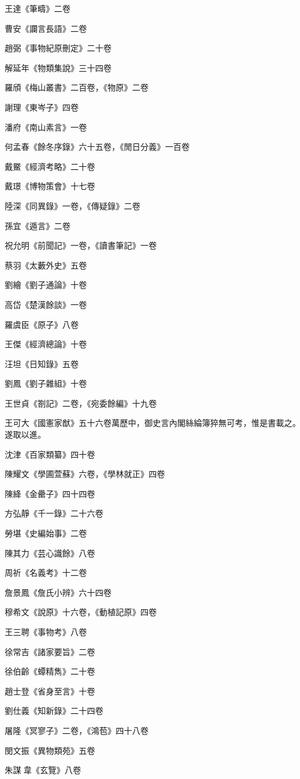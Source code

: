 王達《筆疇》二卷

曹安《讕言長語》二卷

趙弼《事物紀原刪定》二十卷

解延年《物類集說》三十四卷

羅頎《梅山叢書》二百卷，《物原》二卷

謝理《東岑子》四卷

潘府《南山素言》一卷

何孟春《餘冬序錄》六十五卷，《閒日分義》一百卷

戴鱀《經濟考略》二十卷

戴璟《博物策會》十七卷

陸深《同異錄》一卷，《傳疑錄》二卷

孫宜《遁言》二卷

祝允明《前聞記》一卷，《讀書筆記》一卷

蔡羽《太藪外史》五卷

劉繪《劉子通論》十卷

高岱《楚漢餘談》一卷

羅虞臣《原子》八卷

王傑《經濟總論》十卷

汪坦《日知錄》五卷

劉鳳《劉子雜組》十卷

王世貞《劄記》二卷，《宛委餘編》十九卷

王可大《國憲家猷》五十六卷萬歷中，御史言內閣絲綸簿猝無可考，惟是書載之。遂取以進。

沈津《百家類纂》四十卷

陳耀文《學圃萱蘇》六卷，《學林就正》四卷

陳絳《金罍子》四十四卷

方弘靜《千一錄》二十六卷

勞堪《史編始事》二卷

陳其力《芸心識餘》八卷

周祈《名義考》十二卷

詹景鳳《詹氏小辨》六十四卷

穆希文《說原》十六卷，《動植記原》四卷

王三聘《事物考》八卷

徐常吉《諸家要旨》二卷

徐伯齡《蟫精雋》二十卷

趙士登《省身至言》十卷

劉仕義《知新錄》二十四卷

屠隆《冥寥子》二卷，《鴻苞》四十八卷

閔文振《異物類苑》五卷

朱謀韋《玄覽》八卷

